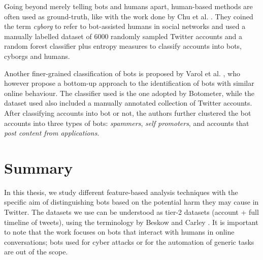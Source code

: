 Going beyond merely telling bots and humans apart, human-based methods are often used as ground-truth, like with the work done by Chu et al. \cite{Cyborgs}. They coined the term \emph{cyborg} to refer to bot-assisted humans in social networks and used a manually labelled dataset of 6000 randomly sampled Twitter accounts and a random forest classifier plus entropy measures to classify accounts into bots, cyborgs and humans.

Another finer-grained classification of bots is proposed by Varol et al. \cite{Varol}, who however propose a bottom-up approach to the identification of bots with similar online behaviour. The classifier used is the one adopted by Botometer, while the dataset used also included a manually annotated collection of Twitter accounts. After classifying accounts into bot or not, the authors further clustered the bot accounts into three types of bots: \emph{spammers}, \textit{self promoters}, and accounts that \textit{post content from applications}.



\section{Summary}
In this thesis, we study different feature-based analysis techniques with the specific aim of distinguishing bots based on the potential harm they may cause in Twitter. The datasets we use can be understood as tier-2 datasets (account + full timeline of tweets), using the terminology by Beskow and Carley \cite{Bot-Hunter}. It is important to note that the work focuses on bots that interact with humans in online conversations; bots used for cyber attacks or for the automation of generic tasks are out of the scope.

